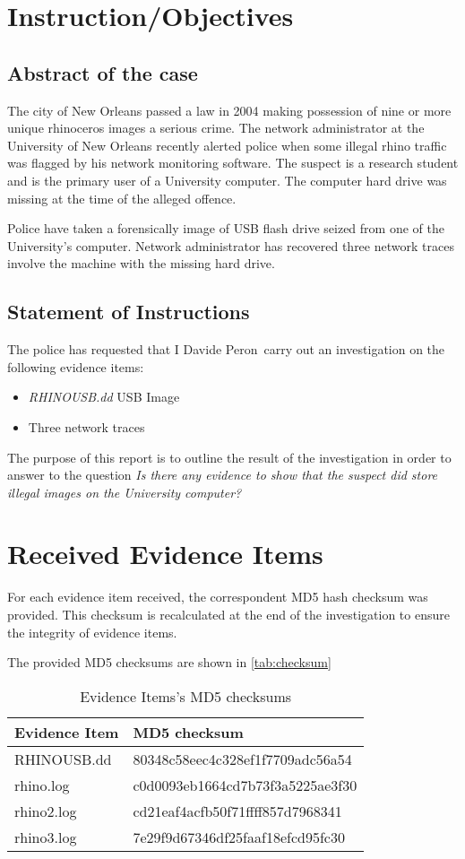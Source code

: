 \documentclass{article}
\newcommand{\writer}{Davide Peron}
\begin{document}
\section{Instruction/Objectives}

\subsection{Abstract of the case}

The city of New Orleans passed a law in 2004 making possession of nine or more unique rhinoceros images a serious crime. The network  administrator at the University of New Orleans recently alerted police when some illegal rhino traffic was flagged by his network monitoring software. The suspect is a research student and is the primary user of a University computer. The computer hard drive was missing at the time of the alleged offence.

Police have taken a forensically image of USB flash drive seized from one of the University's computer.
Network administrator has recovered three network traces involve the machine with the missing hard drive.

\subsection{Statement of Instructions}
The police has requested that I \writer ~carry out an investigation on the following evidence items:

\begin{itemize}
	\item \textit{RHINOUSB.dd} USB Image
	\item Three network traces
\end{itemize}

The purpose of this report is to outline the result of the investigation in order to answer to the question \textit{Is there any evidence to show that the suspect did store illegal images on the University computer?}

\section{Received Evidence Items}

For each evidence item received, the correspondent MD5 hash checksum was provided.
This checksum is recalculated at the end of the investigation to ensure the integrity of evidence items.

The provided MD5 checksums are shown in \autoref{tab:checksum}

\begin{table}[h!]
	\centering
	\begin{tabular}{l|l}
		Evidence Item & MD5 checksum\\
		\hline
		RHINOUSB.dd & 80348c58eec4c328ef1f7709adc56a54\\
		rhino.log & c0d0093eb1664cd7b73f3a5225ae3f30\\
		rhino2.log & cd21eaf4acfb50f71ffff857d7968341\\
		rhino3.log & 7e29f9d67346df25faaf18efcd95fc30
	\end{tabular}
	\caption{Evidence Items's MD5 checksums}
	\label{tab:checksum}
\end{table}
\end{document}
